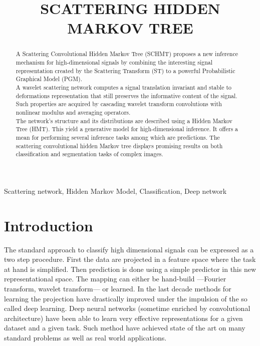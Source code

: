 \documentclass{article}
\title{SCATTERING HIDDEN MARKOV TREE}
\begin{document}
%
\maketitle
%
\begin{abstract}
	A Scattering Convolutional Hidden Markov Tree (SCHMT) proposes a new inference mechanism for high-dimensional signals by combining the interesting signal representation created by the Scattering Transform (ST) to a powerful Probabilistic Graphical Model (PGM). \\
	A wavelet scattering network computes a signal translation invariant and  stable to deformations representation that still preserves the informative content of the signal. Such properties are acquired by cascading wavelet transform convolutions with nonlinear modulus and averaging operators.\\
	The network's structure and its distributions are described using a Hidden Markov Tree (HMT). This yield a generative model for high-dimensional inference. It offers a mean for performing several inference tasks among which are predictions. The scattering convolutional hidden Markov tree displays promising results on both classification and segmentation tasks of complex images.
\end{abstract}
%
\begin{keywords}
	Scattering network, Hidden Markov Model, Classification, Deep network
\end{keywords}
%
\section{Introduction}
\label{sec:Intro}

  The standard approach to classify high dimensional signals can be expressed as a two step procedure. First the data are projected in a feature space where the task at hand is simplified. Then prediction is done using a simple predictor in this new representational space. The mapping can either be hand-build ---\eg Fourier transform, wavelet transform--- or learned. In the last decade methods for learning the projection have drastically improved under the impulsion of the so called deep learning. Deep neural networks (sometime enriched by convolutional architecture) have been able to learn very effective representations for a given dataset and a given task. Such method have achieved state of the art on many standard problems as well as real world applications. 
		
\end{document}
